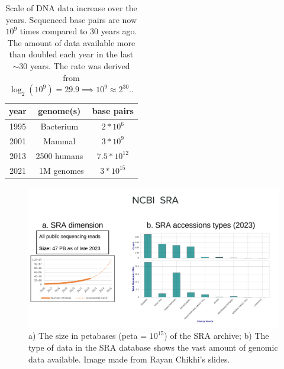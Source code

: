 \begin{table}[!ht]
	\centering
	\begin{tabular}{c | c | c}
		year & genome(s) & base pairs \\
		\hline
		1995 & Bacterium & $ 2*10^{6}$ \\
		2001 & Mammal & $ 3*10^{9}$ \\
		2013 & 2500 humans & $ 7.5*10^{12}$ \\
		2021 & ~1M genomes & $ 3*10^{15}$ \\
	\end{tabular}
	\caption[Scale of DNA data increase over the years.]{Scale of DNA data increase over the years. Sequenced base pairs are now $10^9$ times compared to 30 years ago. The amount of data available more than doubled each year in the last $\sim30$ years. The rate was derived from $ \log_2(10^{9}) = 29.9 \implies 10^{9} \approx 2^{30}$.\cite{durbin_recomb}.}
	\label{tab:bp-increase}
\end{table}
\begin{figure}[h!]
	\centering
	\includegraphics[width=\linewidth]{figures/background/sra.png}
	\caption[The Sequence Read Archive.]{a) The size in petabases (peta = $10^{15}$) of the SRA archive; b) The type of data in the SRA database shows the vast amount of genomic data available. Image made from Rayan Chikhi's slides.\\}
	\label{fig:SRA}
\end{figure}

